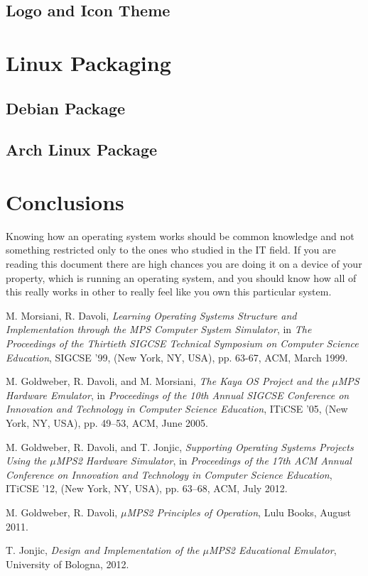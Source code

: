 \documentclass[12pt,a4paper,openright,twoside]{report}
\begin{document}
\section{Logo and Icon Theme}
\chapter{Linux Packaging}
\lhead[\fancyplain{}{\bfseries\thepage}]{\fancyplain{}{\bfseries\rightmark}}
\section{Debian Package}
\section{Arch Linux Package}
\chapter{Conclusions}
\lhead[\fancyplain{}{\bfseries\thepage}]{\fancyplain{}{\bfseries\rightmark}}
Knowing how an operating system works should be common knowledge and not something restricted only to the ones who studied in the IT field.
If you are reading this document there are high chances you are doing it on a device of your property, which is running an operating system, and you should know how all of this really works in other to really feel like you own this particular system.
\begin{thebibliography}{99}

	M. Morsiani, R. Davoli,
	\textit{Learning Operating Systems Structure and Implementation through the MPS Computer System Simulator},
	in \textit{The Proceedings of the Thirtieth SIGCSE Technical Symposium on Computer Science Education},
	SIGCSE ’99, (New York, NY, USA), pp. 63-67, ACM, March 1999.

	M. Goldweber, R. Davoli, and M. Morsiani,
	\textit{The Kaya OS Project and the $\mu$MPS Hardware Emulator},
	in \textit{Proceedings of the 10th Annual SIGCSE Conference on Innovation and Technology in Computer Science Education},
	ITiCSE ’05, (New York, NY, USA), pp. 49–53, ACM, June 2005.

	M. Goldweber, R. Davoli, and T. Jonjic,
	\textit{Supporting Operating Systems Projects Using the $\mu$MPS2 Hardware Simulator},
	in \textit{Proceedings of the 17th ACM Annual Conference on Innovation and Technology in Computer Science Education},
	ITiCSE ’12, (New York, NY, USA), pp. 63–68, ACM, July 2012.

	M. Goldweber, R. Davoli,
	\textit{$\mu$MPS2 Principles of Operation},
	Lulu Books, August 2011.

	T. Jonjic,
	\textit{Design and Implementation of the $\mu$MPS2 Educational Emulator},
	University of Bologna, 2012.

\end{thebibliography}
\end{document}
